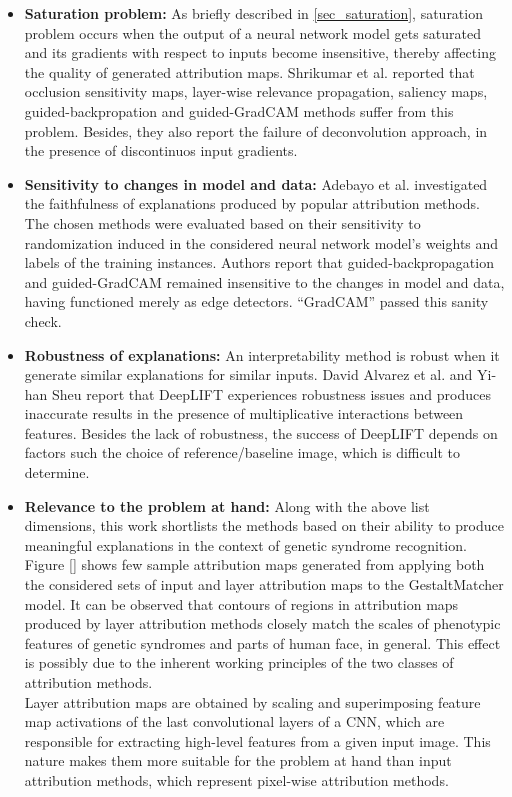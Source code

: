 \documentclass[../report.tex]{subfiles}
\begin{document}
    \begin{itemize}
    	\item \textbf{Saturation problem:} As briefly described in \ref{sec_saturation}, saturation problem occurs when the output of a neural network model gets saturated and its gradients with respect to inputs become insensitive, thereby affecting the quality of generated attribution maps. Shrikumar et al. \cite{shrikumar2017learning} reported that occlusion sensitivity maps, layer-wise relevance propagation, saliency maps, guided-backpropation and guided-GradCAM methods suffer from this problem. Besides, they also report the failure of deconvolution approach, in the presence of discontinuos input gradients.   
    	\item \textbf{Sensitivity to changes in model and data:} Adebayo et al. \cite{adebayo2018sanity} investigated the faithfulness of explanations produced by popular attribution methods. The chosen methods were evaluated based on their sensitivity to randomization induced in the considered neural network model's weights and labels of the training instances. Authors report that guided-backpropagation and guided-GradCAM remained insensitive to the changes in model and data, having functioned merely as edge detectors. \enquote{GradCAM} passed this sanity check.
    	\item \textbf{Robustness of explanations:} An interpretability method is robust when it generate similar explanations for similar inputs. David Alvarez et al. \cite{alvarez2018robustness} and Yi-han Sheu \cite{sheu2020illuminating} report that DeepLIFT experiences robustness issues and produces inaccurate results in the presence of multiplicative interactions between features. Besides the lack of robustness, the success of DeepLIFT depends on factors such the choice of reference/baseline image, which is difficult to determine. 
    	\item \textbf{Relevance to the problem at hand:} Along with the above list dimensions, this work shortlists the methods based on their ability to produce meaningful explanations in the context of genetic syndrome recognition. Figure \ref{}  shows few sample attribution maps generated from applying both the considered sets of input and layer attribution maps to the GestaltMatcher model. It can be observed that contours of regions in attribution maps produced by layer attribution methods closely match the scales of phenotypic features of genetic syndromes and parts of human face, in general. This effect is possibly due to the inherent working principles of the two classes of attribution methods.\\
    	Layer attribution maps are obtained by scaling and superimposing feature map activations of the last convolutional layers of a CNN, which are responsible for extracting high-level features from a given input image. This nature makes them more suitable for the problem at hand than input attribution methods, which represent pixel-wise attribution methods.
    \end{itemize}
 
\end{document}
